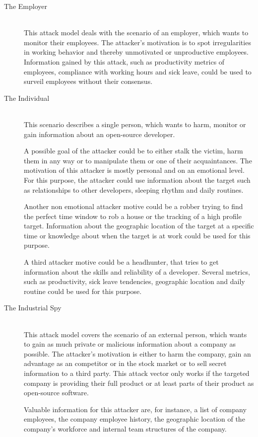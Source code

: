 \begin{description}
    \item[The Employer] \hfill \\
        This attack model deals with the scenario of an employer, which wants to monitor their employees.
        The attacker's motivation is to spot irregularities in working behavior and thereby unmotivated or unproductive employees.
        Information gained by this attack, such as productivity metrics of employees, compliance with working hours and sick leave, could be used to surveil employees without their consensus.

    \item[The Individual] \hfill \\
        This scenario describes a single person, which wants to harm, monitor or gain information about an open-source developer.

        A possible goal of the attacker could be to either stalk the victim, harm them in any way or to manipulate them or one of their acquaintances.
        The motivation of this attacker is mostly personal and on an emotional level.
        For this purpose, the attacker could use information about the target such as relationships to other developers, sleeping rhythm and daily routines.

        Another non emotional attacker motive could be a robber trying to find the perfect time window to rob a house or the tracking of a high profile target.
        Information about the geographic location of the target at a specific time or knowledge about when the target is at work could be used for this purpose.

        A third attacker motive could be a headhunter, that tries to get information about the skills and reliability of a developer.
        Several metrics, such as productivity, sick leave tendencies, geographic location and daily routine could be used for this purpose.

    \item[The Industrial Spy]~\label{attack:industrial-spy} \hfill \\
        This attack model covers the scenario of an external person, which wants to gain as much private or malicious information about a company as possible.
        The attacker's motivation is either to harm the company, gain an advantage as an competitor or in the stock market or to sell secret information to a third party.
        This attack vector only works if the targeted company is providing their full product or at least parts of their product as open-source software.

        Valuable information for this attacker are, for instance, a list of company employees, the company employee history, the geographic location of the company's workforce and internal team structures of the company.
\end{description}


